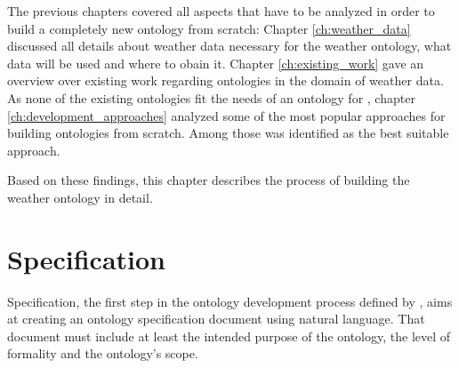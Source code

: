 The previous chapters covered all aspects that have to be analyzed in order to build a completely new ontology from scratch: Chapter \ref{ch:weather_data} discussed all details about weather data necessary for the \thinkhome weather ontology, what data will be used and where to obain it. Chapter \ref{ch:existing_work} gave an overview over existing work regarding ontologies in the domain of weather data. As none of the existing ontologies fit the needs of an ontology for \thinkhome, chapter  \ref{ch:development_approaches} analyzed some of the most popular approaches for building ontologies from scratch. Among those \methontology was identified as the best suitable approach. %

Based on these findings, this chapter describes the process of building the \thinkhome weather ontology in detail.

\section{Specification}

Specification, the first step in the ontology development process defined by \methontology, aims at creating an ontology specification document using natural language. That document must include at least the intended purpose of the ontology, the level of 
formality and the ontology's scope.

